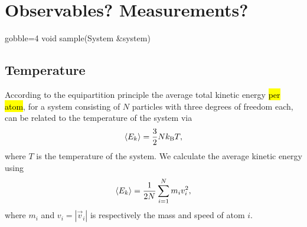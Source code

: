\section{Observables? Measurements?}
% 
% 
%
%
%
\begin{listing}[!htb]%
\begin{cppcode*}{gobble=4}
    void sample(System &system)
    {
    }
\end{cppcode*}
\caption{%
    \hl{FINISH THIS LISTING}. Implementation of the function \texttt{sample} from \cref{list:simple_md_program}.%
    \label{list:sampling}%
}%
\end{listing}%


\subsection{Temperature}
According to the equipartition principle the average total kinetic energy \hl{per atom}, for a system consisting of $N$ particles with three degrees of freedom each, can be related to the temperature of the system via
\begin{align*}
    \Braket{E_k} = \frac{3}{2}Nk_\text{B}T,
\end{align*}
where $T$ is the temperature of the system. We calculate the average kinetic energy using
\begin{align*}
    \Braket{E_k} = \frac{1}{2N}\sum_{i=1}^N m_i v_i^2,
\end{align*}
where $m_i$ and $v_i = |\vec v_i|$ is respectively the mass and speed of atom $i$. 

